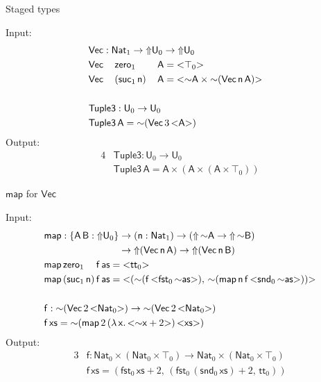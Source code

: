 \documentclass[dvipsnames,aspectratio=169]{beamer}
\newcommand{\msf}[1]{\mathsf{#1}}
\newcommand{\Lift}{{\Uparrow}}
\newcommand{\spl}{{\sim}}
\newcommand{\qut}[1]{{<}#1{>}}
\newcommand{\U}{\msf{U}}
\newcommand{\Nat}{\msf{Nat}}
\newcommand{\zero}{\msf{zero}}
\newcommand{\suc}{\msf{suc}}
\renewcommand{\tt}{\msf{tt}}
\newcommand{\fst}{\msf{fst}}
\newcommand{\snd}{\msf{snd}}
\theoremstyle{remark}
\newcommand{\Vect}{\msf{Vec}}
\newcommand{\msA}{\msf{A}}
\newcommand{\msB}{\msf{B}}
\newcommand{\msx}{\msf{x}}
\newcommand{\msas}{\msf{as}}
\newcommand{\msxs}{\msf{xs}}
\newcommand{\msff}{\msf{f}}
\newcommand{\msn}{\msf{n}}
\begin{document}
\begin{frame}{Staged types}

Input:
\begin{alignat*}{4}
  & \rlap{$\Vect : \Nat_1 \to \Lift \U_0 \to \Lift \U_0$}\\
  & \Vect\,&&\zero_1       \,&&\msA = \qut{\top_0}\\
  & \Vect\,&&(\suc_1\,\msn)\,&&\msA = \qut{\spl \msA \times \spl(\Vect\,\msn\,\msA)}\\
  & \\
  & \rlap{$\msf{Tuple3} : \U_0 \to \U_0$} \\
  & \rlap{$\msf{Tuple3}\,\msA = \spl(\Vect\,3\,\qut{\msA})$}
\end{alignat*}
\pause
Output:
\begin{alignat*}{4}
  &\msf{Tuple3} : \U_0 \to \U_0 \\
  &\msf{Tuple3}\,\msA = \msA \times (\msA \times (\msA \times \top_0))
\end{alignat*}

\end{frame}

\begin{frame}{$\msf{map}$ for $\Vect$}

Input:
\begin{alignat*}{3}
  &\msf{map} : \{\msA\,\msB : \Lift \U_0\} \to
  (\msn : \Nat_1) \to (\Lift\,\spl\msA \to \Lift\,\spl\msB) \\
  & \hspace{7.7em} \to \Lift(\Vect\,\msn\,\msA) \to \Lift(\Vect\,\msn\,\msB)\\
  &\msf{map}\,\zero_1\hspace{1.25em}\msff\,\msas = \qut{\tt_0} \\
  &\msf{map}\,(\suc_1\,\msn)\,\msff\,\msas =
    \qut{(\spl(\msff\,\qut{\fst_0\,\spl \msas}),\,\spl(\msf{map}\,\msn\,\msff\,\qut{\snd_0\,\spl \msas}))} \\
  & \\
  & \msf{f} : \spl(\Vect\,2\,\qut{\Nat_0}) \to \spl(\Vect\,2\,\qut{\Nat_0}) \\
  & \msf{f}\,\msxs = \spl(\msf{map}\,2\,(\lambda\,\msx.\,\qut{\spl\msx + 2})\,\qut{\msxs})
\end{alignat*}
\pause
Output:
\begin{alignat*}{3}
  & \msf{f} : \Nat_0 \times (\Nat_0 \times \top_0) \to \Nat_0 \times (\Nat_0 \times \top_0) \\
  & \msf{f}\,\msxs = (\fst_0\,\msxs + 2,\,(\fst_0\,(\snd_0\,\msxs) + 2,\,\tt_0))
\end{alignat*}

\end{frame}
\end{document}
